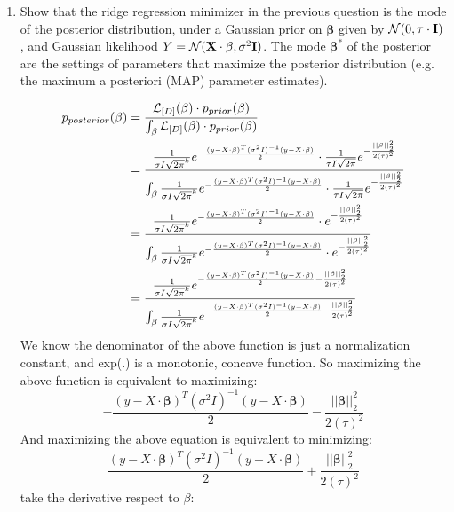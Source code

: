 \documentclass[11pt]{article}
\renewcommand{\vec}[1]{\mathbf{#1}}
\begin{document}
\begin{enumerate}
\begin{answertext}{10cm}{}
\end{answertext} 

\pagebreak


\item Show that the ridge regression minimizer in the previous question is the mode of the posterior distribution, under a Gaussian prior on $\vec{\beta}$ given by ${\cal N}(0, \tau \cdot \vec{I})$, and Gaussian likelihood $Y = {\cal N}(\vec{X} \cdot \vec{\beta}, \sigma^2 \vec{I})$.  The mode $\vec{\beta}^*$ of the posterior are the settings of parameters that maximize the posterior distribution (e.g. the maximum a posteriori (MAP) parameter estimates).

\begin{answertext}{16cm}{}
\begin{align}
p_{posterior}{(\vec{\beta})} &= \frac{{\cal L}_{[D]}(\vec{\beta}) \cdot p_{prior}(\vec{\beta})}{\int_{\vec{\beta}} {\cal L}_{[D]}(\vec{\beta}) \cdot p_{prior}(\vec{\beta}) } \notag \\ 
&=\frac{
\frac{1}{\sigma I \sqrt{2 \pi}^k } e^{-\frac{(y - X \cdot \vec{\beta})^{T}(\sigma^2I)^{-1}(y - X \cdot \vec{\beta})}{2}} \cdot
\frac{1}{\tau I \sqrt{2 \pi}} e^{-\frac{||\vec{\beta}||^{2}_{2}}{2 {(\tau)}^2}}  
}{\int_{\vec{\beta}}
\frac{1}{\sigma I \sqrt{2 \pi}^k } e^{-\frac{(y - X \cdot \vec{\beta})^{T}(\sigma^2I)^{-1}(y - X \cdot \vec{\beta})}{2}} \cdot
\frac{1}{\tau I \sqrt{2 \pi}} e^{-\frac{||\vec{\beta}||^{2}_{2}}{2 {(\tau)}^2}}  
} \notag \\ 
&=\frac{
\frac{1}{\sigma I \sqrt{2 \pi}^k } e^{-\frac{(y - X \cdot \vec{\beta})^{T}(\sigma^2I)^{-1}(y - X \cdot \vec{\beta})}{2}} \cdot e^{-\frac{||\vec{\beta}||^{2}_{2}}{2 {(\tau)}^2}}  
}{\int_{\vec{\beta}}
\frac{1}{\sigma I \sqrt{2 \pi}^k } e^{-\frac{(y - X \cdot \vec{\beta})^{T}(\sigma^2I)^{-1}(y - X \cdot \vec{\beta})}{2}} \cdot e^{-\frac{||\vec{\beta}||^{2}_{2}}{2 {(\tau)}^2}}  
} \notag \\
&=\frac{
\frac{1}{\sigma I \sqrt{2 \pi}^k } e^{-\frac{(y - X \cdot \vec{\beta})^{T}(\sigma^2I)^{-1}(y - X \cdot \vec{\beta})}{2} -\frac{||\vec{\beta}||^{2}_{2}}{2 {(\tau)}^2}}  
}{\int_{\vec{\beta}}
\frac{1}{\sigma I \sqrt{2 \pi}^k } e^{-\frac{(y - X \cdot \vec{\beta})^{T}(\sigma^2I)^{-1}(y - X \cdot \vec{\beta})}{2} -\frac{||\vec{\beta}||^{2}_{2}}{2 {(\tau)}^2}}  
} \notag
\end{align}
We know the denominator of the above function is just a normalization constant, and exp(.) is a monotonic, concave function. So maximizing the above function is equivalent to maximizing:
$$-\frac{(y - X \cdot \vec{\beta})^{T}(\sigma^2I)^{-1}(y - X \cdot \vec{\beta})}{2} -\frac{||\vec{\beta}||^{2}_{2}}{2 {(\tau)}^2}$$
And maximizing the above equation is equivalent to minimizing:
$$\frac{(y - X \cdot \vec{\beta})^{T}(\sigma^2I)^{-1}(y - X \cdot \vec{\beta})}{2} +\frac{||\vec{\beta}||^{2}_{2}}{2 {(\tau)}^2}$$
take the derivative respect to $\beta$:


\end{answertext}
\end{enumerate}
\end{document}
